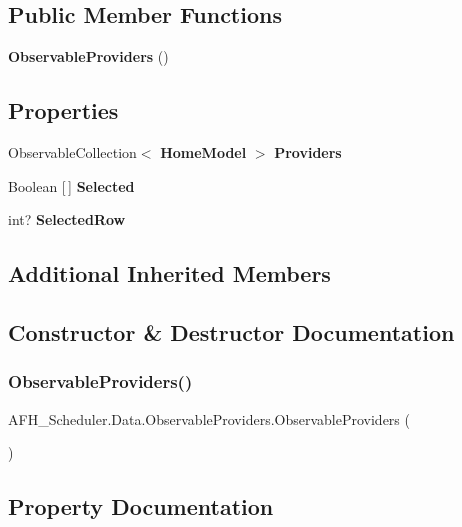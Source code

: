 \subsection*{Public Member Functions}
\begin{DoxyCompactItemize}
\item 
\textbf{ Observable\+Providers} ()
\end{DoxyCompactItemize}
\subsection*{Properties}
\begin{DoxyCompactItemize}
\item 
Observable\+Collection$<$ \textbf{ Home\+Model} $>$ \textbf{ Providers}\hspace{0.3cm}{\ttfamily  [get, set]}
\item 
Boolean [$\,$] \textbf{ Selected}\hspace{0.3cm}{\ttfamily  [get, set]}
\item 
int? \textbf{ Selected\+Row}\hspace{0.3cm}{\ttfamily  [get, set]}
\end{DoxyCompactItemize}
\subsection*{Additional Inherited Members}


\subsection{Constructor \& Destructor Documentation}
\mbox{\label{class_a_f_h___scheduler_1_1_data_1_1_observable_providers_a43dc7a1ffec227d30edd7db71ee38820}} 
\subsubsection{ObservableProviders()}
{\footnotesize\ttfamily A\+F\+H\+\_\+\+Scheduler.\+Data.\+Observable\+Providers.\+Observable\+Providers (\begin{DoxyParamCaption}{ }\end{DoxyParamCaption})}



\subsection{Property Documentation}
\mbox{\label{class_a_f_h___scheduler_1_1_data_1_1_observable_providers_a691ecf16e365be6479a486f0347c59bf}} 
